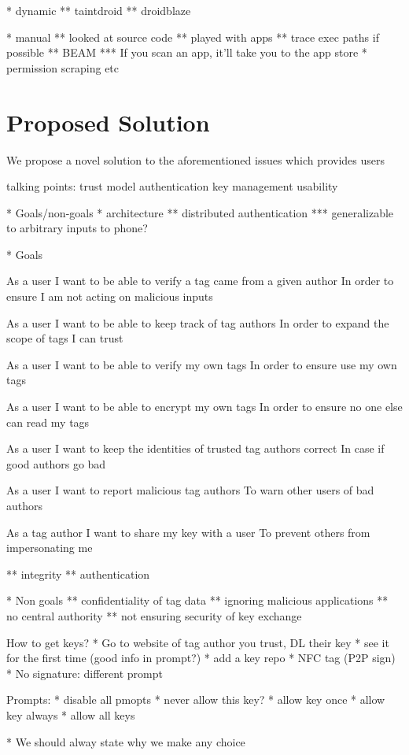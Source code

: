 \documentclass[12pt]{article}
\begin{document}
* dynamic
** taintdroid
** droidblaze

* manual
** looked at source code
** played with apps
** trace exec paths if possible
** BEAM
*** If you scan an app, it'll take you to the app store
* permission scraping etc

\section{Proposed Solution}
We propose a novel solution to the aforementioned issues which provides users 


talking points:
trust model
authentication
key management
usability

* Goals/non-goals
* architecture
** distributed authentication
*** generalizable to arbitrary inputs to phone?

* Goals

As a user
I want to be able to verify a tag came from a given author
In order to ensure I am not acting on malicious inputs

As a user
I want to be able to keep track of tag authors
In order to expand the scope of tags I can trust

As a user
I want to be able to verify my own tags
In order to ensure use my own tags

As a user
I want to be able to encrypt my own tags
In order to ensure no one else can read my tags

As a user
I want to keep the identities of trusted tag authors correct
In case if good authors go bad

As a user
I want to report malicious tag authors
To warn other users of bad authors

As a tag author
I want to share my key with a user
To prevent others from impersonating me

** integrity
** authentication

* Non goals
** confidentiality of tag data
** ignoring malicious applications
** no central authority
** not ensuring security of key exchange


How to get keys?
* Go to website of tag author you trust, DL their key
* see it for the first time (good info in prompt?)
* add a key repo
* NFC tag (P2P sign)
* No signature: different prompt

Prompts:
* disable all pmopts
* never allow this key?
* allow key once
* allow key always
* allow all keys

* We should alway state why we make any choice
\end{document}

